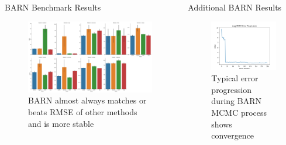 \documentclass{beamer}
\newlength{\columnheight}
\begin{document}
\begin{frame}
\begin{columns}
\begin{column}{.33\textwidth}
\begin{minipage}{.98\textwidth}
{		\begin{myblock}{BARN Benchmark Results}
\begin{figure}[h]
\centering
    \includegraphics[scale=.62]{pres_results.png}
    \caption{BARN almost always matches or beats RMSE of other methods and is more stable}
    \label{fig:results}
\end{figure}

        \end{myblock}

	}

	\end{minipage}
	\end{column}
	\begin{column}{.33\textwidth}
	\begin{minipage}{.98\textwidth}  %
		\parbox[t][\columnheight]{\textwidth}{ %
		\begin{myblock}{Additional BARN Results}
\begin{figure}[h]
\centering
    \includegraphics[scale=1.0]{mpg_phi.png}
    \caption{Typical error progression during BARN MCMC process shows convergence}
    \label{fig:error}
\end{figure}



\end{myblock}}
\end{minipage}
\end{column}
\end{columns}
\end{frame}
\end{document}
